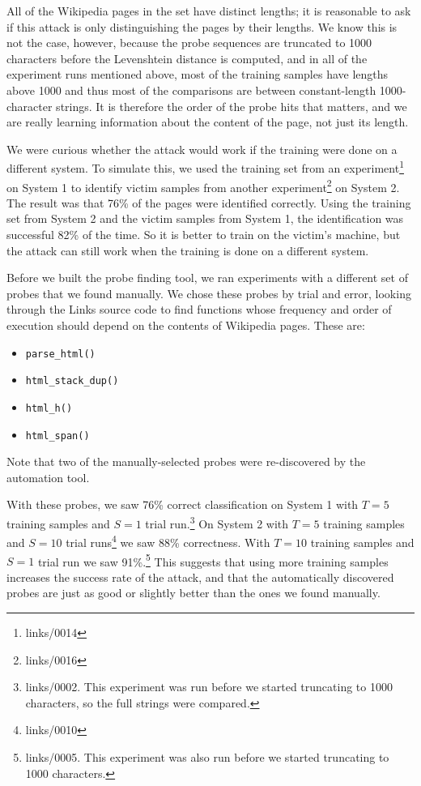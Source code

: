 \documentclass[letterpaper,twocolumn,10pt]{article}
\begin{document}
All of the Wikipedia pages in the set have distinct lengths; it is
reasonable to ask if this attack is only distinguishing the pages by their
lengths. We know this is not the case, however, because the probe sequences are
truncated to 1000 characters before the Levenshtein distance is computed, and in
all of the experiment runs mentioned above, most of the training samples have
lengths above 1000 and thus most of the comparisons are between constant-length
1000-character strings. It is therefore the order of the probe hits that matters, and
we are really learning information about the content of the page,
not just its length.

We were curious whether the attack would work if the training were done on
a different system. To simulate this, we used the training set from an
experiment\footnote{links/0014} on System 1 to identify victim samples from
another experiment\footnote{links/0016} on System 2. The result was that 76\%
of the pages were identified correctly. Using the training set from System 2 and
the victim samples from System 1, the identification was successful 82\% of
the time. So it is better to train on the victim's machine, but the attack can
still work when the training is done on a different system.

Before we built the probe finding tool, we ran experiments with a different set
of probes that we found manually. We chose these probes by trial and error,
looking through the Links source code to find functions whose frequency and
order of execution should depend on the contents of Wikipedia pages. These are:

\begin{itemize}
\setlength{\itemsep}{0pt}
    \item \texttt{parse\_html()}
    \item \texttt{html\_stack\_dup()}
    \item \texttt{html\_h()}
    \item \texttt{html\_span()}
\end{itemize}

Note that two of the manually-selected probes were re-discovered by the
automation tool.

With these probes, we saw 76\% correct classification on System 1 with $T=5$
training samples and $S=1$ trial run.\footnote{links/0002. This experiment was
run before we started truncating to 1000 characters, so the full strings were
compared.} On System 2 with $T=5$ training samples and $S=10$ trial
runs\footnote{links/0010} we saw 88\% correctness. With $T=10$ training samples
and $S=1$ trial run we saw 91\%.\footnote{links/0005. This experiment was also
run before we started truncating to 1000 characters.} This suggests that using
more training samples increases the success rate of the attack, and that the
automatically discovered probes are just as good or slightly better than the
ones we found manually.
\end{document}
